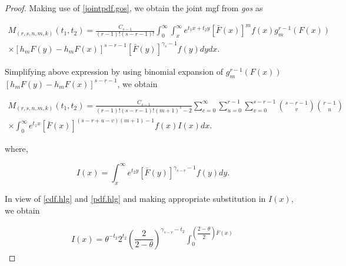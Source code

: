 \documentclass[11pt,a4paper]{article}
\numberwithin{equation}{section}
\begin{document}
	\begin{proof}

		Making use of \eqref{jointpdf.gos}, we obtain the joint mgf from \textit{gos} as

		\begin{eqnarray}  

			M_{\left(r,s,n,m,k\right)}({t_{1},t_{2}}) =\frac{C_{s-1} }{\left(r-1\right)!\left(s-r-1\right)!}\int_{0}^{\infty}\int_{x}^{\infty} e^{t_{1}x+t_{2}y  }\left[\bar{F}\left(x\right)\right]^{m} f\left(x\right)g_{m}^{r-1} \left(F\left(x\right)\right) \nonumber \nonumber \\

			\times \left[h_{m} F\left(y\right)-h_{m} F\left(x\right)\right]^{s-r-1}\left[\bar{F}\left(y\right)\right]^{\gamma _{s} -1} f\left(y\right)dydx.\nonumber

		\end{eqnarray}

		Simplifying above expression by using binomial expansion of $g_{m}^{r-1}   \left(F\left(x\right)\right)$  $\left[h_{m} F\left(y\right)-h_{m} F\left(x\right)\right]^{s-r-1}$, we obtain

		\begin{eqnarray}

			M_{\left(r,s,n,m,k\right)}({t_{1},t_{2}}) =\frac{C_{s-1} }{\left(r-1\right)!\left(s-r-1\right)!(m+1)^s-2}\sum_{c=0}^{\infty}\sum_{u=0}^{r-1}\sum_{v=0}^{s-r-1}\binom{s-r-1}{v}\binom{r-1}{u}\nonumber\\

			\times\int_{0}^{\infty} e^{t_{1}x}\left[\bar{F}\left(x\right)\right]^{(s-r+u-v)(m+1)-1}f(x)I(x)dx.

		\end{eqnarray}

		where,

		\begin{equation}

			I(x)=\int_{x}^{\infty}e^{t_{2}y}\left[\bar{F}\left(y\right)\right]^{\gamma _{s-v} -1} f\left(y\right)dy.\nonumber

		\end{equation}

		In view of \eqref{cdf.hlg} and \eqref{pdf.hlg} and making appropriate substitution in $I(x)$, we obtain

		\begin{eqnarray}

			I(x)=\theta^{-t_{2}}2^{t_{2}}\left(\dfrac{2}{2-\theta}\right)^{\gamma_{s-v}-t_{2}}\int_{0}^{\left(\dfrac{2-\theta}{2}\right)\bar{F}\left(x\right)}


\end{eqnarray}
\end{proof}
\end{document}
